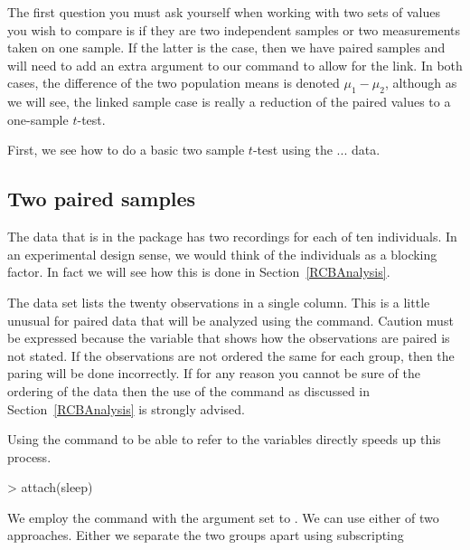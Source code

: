 The first question you must ask yourself when working with two sets of values you wish to compare is if they are two independent samples or two measurements taken on one sample. If the latter is the case, then we have paired samples and will need to add an extra argument to our command to allow for the link. In both cases, the difference of the two population means is denoted $\mu_1-\mu_2$, although as we will see, the linked sample case is really a reduction of the paired values to a one-sample $t$-test.  
 
First, we see how to do a basic two sample $t$-test using the ... data. 
 
\subsection{Two paired samples} 
\label{PairedSamplesTTest} 
 
The  data that is in the  package has two recordings for each of ten individuals. In an experimental design sense, we would think of the individuals as a blocking factor. In fact we will see how this is done in Section~\ref{RCBAnalysis}. 
 
The data set lists the twenty observations in a single column. This is a little unusual for paired data that will be analyzed using the  command. Caution must be expressed because the variable that shows how the observations are paired is not stated. If the observations are not ordered the same for each group, then the paring will be done incorrectly. If for any reason you cannot be sure of the ordering of the data then the use of the  command as discussed in Section~\ref{RCBAnalysis} is strongly advised. 
 
Using the  command to be able to refer to the variables directly speeds up this process. 

\begin{Schunk}
\begin{Sinput}
> attach(sleep) 
\end{Sinput}
\end{Schunk}

 
We employ the  command with the  argument set to . We can use either of two approaches. Either we separate the two groups apart using subscripting 

